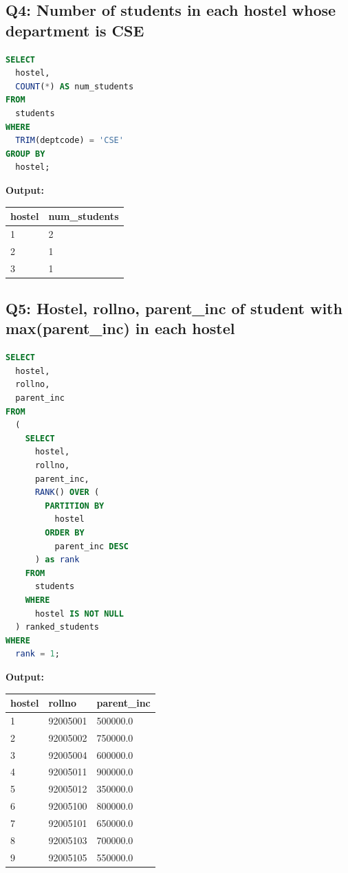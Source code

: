 \documentclass[11pt, a4paper]{article}
\begin{document}
\subsection*{Q4: Number of students in each hostel whose department is CSE}
\begin{lstlisting}[language=SQL]
SELECT
  hostel,
  COUNT(*) AS num_students
FROM
  students
WHERE
  TRIM(deptcode) = 'CSE'
GROUP BY
  hostel;
\end{lstlisting}
\vspace{0.3cm}
\textbf{Output:}\vspace{0.2cm}
\begin{center}
\begin{tabular}{|l|l|}
\hline
\textbf{hostel} & \textbf{num\_students} \\ \hline
1 & 2 \\ \hline
2 & 1 \\ \hline
3 & 1 \\ \hline
\end{tabular}
\end{center}
\newpage
\subsection*{Q5: Hostel, rollno, parent\_inc of student with max(parent\_inc) in each hostel}
\begin{lstlisting}[language=SQL]
SELECT
  hostel,
  rollno,
  parent_inc
FROM
  (
    SELECT
      hostel,
      rollno,
      parent_inc,
      RANK() OVER (
        PARTITION BY
          hostel
        ORDER BY
          parent_inc DESC
      ) as rank
    FROM
      students
    WHERE
      hostel IS NOT NULL
  ) ranked_students
WHERE
  rank = 1;
\end{lstlisting}
\vspace{0.3cm}
\textbf{Output:}\vspace{0.2cm}
\begin{center}
\begin{tabular}{|l|l|l|}
\hline
\textbf{hostel} & \textbf{rollno} & \textbf{parent\_inc} \\ \hline
1 & 92005001 & 500000.0 \\ \hline
2 & 92005002 & 750000.0 \\ \hline
3 & 92005004 & 600000.0 \\ \hline
4 & 92005011 & 900000.0 \\ \hline
5 & 92005012 & 350000.0 \\ \hline
6 & 92005100 & 800000.0 \\ \hline
7 & 92005101 & 650000.0 \\ \hline
8 & 92005103 & 700000.0 \\ \hline
9 & 92005105 & 550000.0 \\ \hline
\end{tabular}
\end{center}
\newpage
\end{document}
